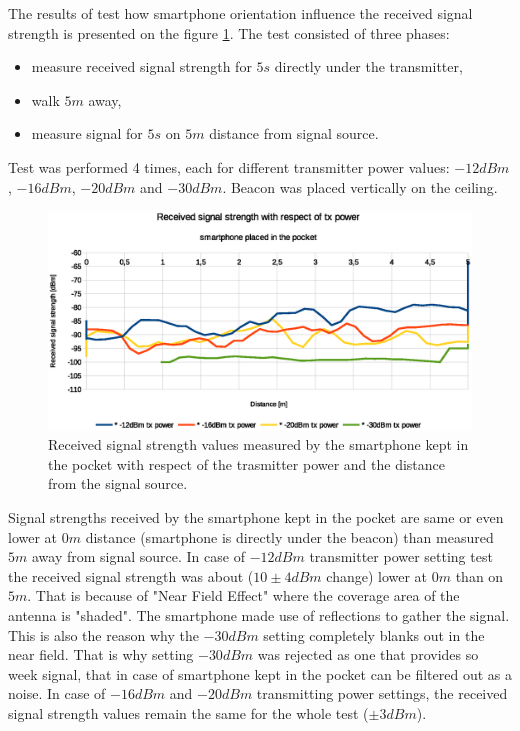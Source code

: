 \documentclass[../main.tex]{subfiles}
\begin{document}
The results of test how smartphone orientation influence the received signal strength is presented on the figure \ref{fig:tests_case2_smartphone_in_pocket_tx_power}. The test consisted of three phases:
\begin{itemize}
	\item measure received signal strength for $5 s$ directly under the transmitter,
	\item walk $5 m$ away,
	\item measure signal for $5 s$ on $5 m$ distance from signal source.
\end{itemize}

 Test was performed 4 times, each for different transmitter power values: $-12dBm$, $-16dBm$, $-20dBm$ and $-30dBm$. Beacon was placed vertically on the ceiling.

\begin{figure}[!htbp]
\includegraphics[width=\textwidth, keepaspectratio]{pictures/tests_case2_smartphone_in_pocket_tx_power}
\centering
\caption{Received signal strength values measured by the smartphone kept in the pocket with respect of the trasmitter power and the distance from the signal source.}
\label{fig:tests_case2_smartphone_in_pocket_tx_power}
\end{figure}

Signal strengths received by the smartphone kept in the pocket are same or even lower at $0m$ distance (smartphone is directly under the beacon) than measured $5m$ away from signal source. In case of $-12dBm$ transmitter power setting test the received signal strength was about ($10\pm4 dBm$ change) lower at $0m$ than on $5m$. That is because of "Near Field Effect" where the coverage area of the antenna is "shaded". The smartphone made use of reflections to gather the signal. This is also the reason why the $-30dBm$ setting completely blanks out in the near field. That is why setting $-30dBm$ was rejected as one that provides so week signal, that in case of smartphone kept in the pocket can be filtered out as a noise. In case of $-16dBm$ and $-20dBm$ transmitting power settings, the received signal strength values remain the same for the whole test ($\pm 3dBm$).
\end{document}
